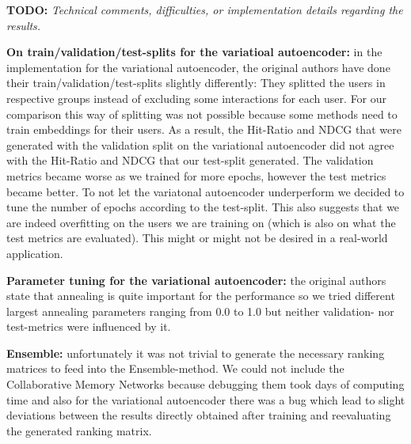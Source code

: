 \textbf{TODO: }
\textit{Technical comments, difficulties, or implementation details regarding the results.}

\textbf{On train/validation/test-splits for the variatioal autoencoder:} in the implementation for the variational autoencoder, the original authors have done their train/validation/test-splits slightly differently: They splitted the users in respective groups instead of excluding some interactions for each user. For our comparison this way of splitting was not possible because some methods need to train embeddings for their users. As a result, the Hit-Ratio and NDCG that were generated with the validation split on the variational autoencoder did not agree with the Hit-Ratio and NDCG that our test-split generated. The validation metrics became worse as we trained for more epochs, however the test metrics became better. To not let the variatonal autoencoder underperform we decided to tune the number of epochs according to the test-split. This also suggests that we are indeed overfitting on the users we are training on (which is also on what the test metrics are evaluated). This might or might not be desired in a real-world application.

\textbf{Parameter tuning for the variational autoencoder:} the original authors state that annealing is quite important for the performance so we tried different largest annealing parameters ranging from 0.0 to 1.0 but neither validation- nor test-metrics were influenced by it.

\textbf{Ensemble:} unfortunately it was not trivial to generate the necessary ranking matrices to feed into the Ensemble-method. We could not include the Collaborative Memory Networks because debugging them took days of computing time and also for the variational autoencoder there was a bug which lead to slight deviations between the results directly obtained after training and reevaluating the generated ranking matrix.

